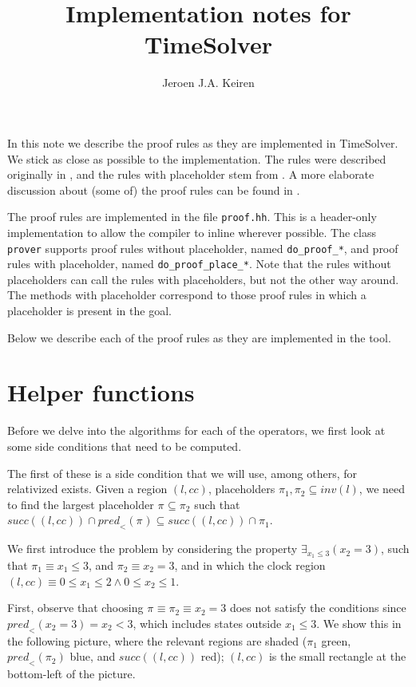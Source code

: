 \documentclass{article}
\title{Implementation notes for TimeSolver}
\author{Jeroen J.A. Keiren}
\newcommand{\placeholder}[1][]{\pi_{#1}}
\newcommand{\loc}{l}
\newcommand{\region}{\mathit{cc}}
\newcommand{\suc}{\mathit{succ}}
\newcommand{\pre}{\mathit{pred}}
\newcommand{\inv}{\mathit{inv}}
\begin{document}
\maketitle


In this note we describe the proof rules as they are implemented in TimeSolver. We stick as close as possible to the implementation.
The rules were described originally in \cite{ZC:05rtss}, and the rules with placeholder stem from \cite{FC:14}. A more elaborate
discussion about (some of) the proof rules can be found in \cite{FC:14report}.

The proof rules are implemented in the file \texttt{proof.hh}. This is a header-only implementation to allow the compiler to inline wherever possible.
The class \texttt{prover} supports proof rules without placeholder, named \texttt{do\_proof\_*}, and proof rules with placeholder, named \texttt{do\_proof\_place\_*}. Note that the rules without placeholders can call the rules with placeholders, but not the other way around. The methods with placeholder correspond to those proof rules in which a placeholder is present in the goal.

Below we describe each of the proof rules as they are implemented in the tool.

\section{Helper functions}
Before we delve into the algorithms for each of the operators, we first look at some side conditions that need to be computed.

The first of these is a side condition that we will use, among others, for relativized exists. Given a region $(\loc, \region)$, placeholders $\placeholder[1], \placeholder[2] \subseteq \inv(\loc)$, we need to find the largest placeholder $\placeholder \subseteq \placeholder[2]$ such that $\suc((\loc, \region)) \cap \pre_{<}(\placeholder) \subseteq \suc((\loc, \region)) \cap \placeholder[1]$.

We first introduce the problem by considering the property $\exists_{x_1 \leq 3}(x_2 = 3)$, such that $\placeholder[1] \equiv x_1 \leq 3$, and $\placeholder[2] \equiv x_2 = 3$, and in which the clock region $(\loc, \region) \equiv 0 \leq x_1 \leq 2 \land 0 \leq x_2 \leq 1$.

First, observe that choosing $\placeholder \equiv \placeholder[2] \equiv x_2 = 3$ does not satisfy the conditions since $\pre_{<}(x_2 = 3) = x_2 < 3$, which includes states outside $x_1 \leq 3$. We show this in the following picture, where the relevant regions are shaded ($\placeholder[1]$ green, $\pre_{<}(\placeholder[2])$ blue, and $\suc((\loc, \region))$ red); $(\loc, \region)$ is the small rectangle at the bottom-left of the picture.
\end{document}
